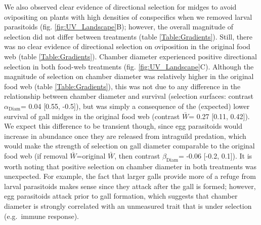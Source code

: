 \documentclass[11pt,]{article}
\begin{document}
We also observed clear evidence of directional selection for midges to
avoid ovipositing on plants with high densities of conspecifics when we
removed larval parasitoids (fig. \ref{fig:UV_Landscape}B); however, the
overall magnitude of selection did not differ between treatments (table
\ref{Table:Gradients}). Still, there was no clear evidence of
directional selection on oviposition in the original food web (table
\ref{Table:Gradients}). Chamber diameter experienced positive
directional selection in both food-web treatments (fig.
\ref{fig:UV_Landscape}C). Although the magnitude of selection on chamber
diameter was relatively higher in the original food web (table
\ref{Table:Gradients}), this was not due to any difference in the
relationship between chamber diameter and survival (selection surfaces:
contrast \(\alpha_{\text{Diam}}\)= 0.04 {[}0.55, -0.5{]}), but was
simply a consequence of the (expected) lower survival of gall midges in
the original food web (contrast \(\bar W\)= 0.27 {[}0.11, 0.42{]}). We
expect this difference to be transient though, since egg parasitoids
would increase in abundance once they are released from intraguild
predation, which would make the strength of selection on gall diameter
comparable to the original food web (if removal \(\bar W\)=original
\(\bar W\), then contrast \(\beta_{\text{Diam}}\)= -0.06 {[}-0.2,
0.1{]}). It is worth noting that positive selection on chamber diameter
in both treatments was unexpected. For example, the fact that larger
galls provide more of a refuge from larval parasitoids makes sense since
they attack after the gall is formed; however, egg parasitoids attack
prior to gall formation, which suggests that chamber diameter is
strongly correlated with an unmeasured trait that is under selection
(e.g.~immune response).

\bigskip
\end{document}
